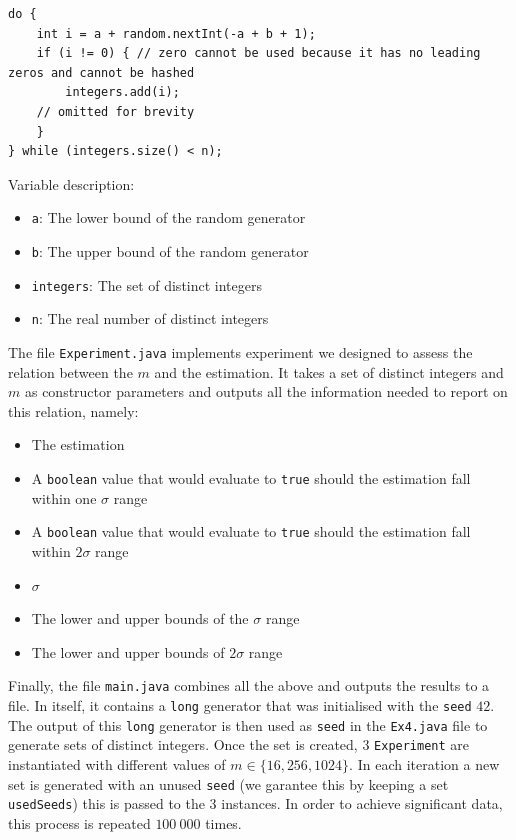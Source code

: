 \documentclass{tufte-handout}
\begin{document}
\begin{lstlisting}
do {
	int i = a + random.nextInt(-a + b + 1);
	if (i != 0) { // zero cannot be used because it has no leading zeros and cannot be hashed
		integers.add(i);
    // omitted for brevity
	}			
} while (integers.size() < n);
\end{lstlisting}
\noindent
Variable description:
\begin{itemize}
    \item {\tt a}: The lower bound of the random generator
    \item {\tt b}: The upper bound of the random generator
    \item {\tt integers}: The set of distinct integers
    \item {\tt n}: The real number of distinct integers
\end{itemize}
\noindent
The file {\tt Experiment.java} implements experiment we designed to assess the relation between the $m$ and the estimation. It takes a set of distinct integers and $m$ as constructor parameters and outputs all the information needed to report on this relation, namely:
\begin{itemize}
    \item The estimation
    \item A {\tt boolean} value that would evaluate to {\tt true} should the estimation fall within one $\sigma$ range  
    \item A {\tt boolean} value that would evaluate to {\tt true} should the estimation fall within $2\sigma$ range 
    \item $\sigma$
    \item The lower and upper bounds of the $\sigma$ range
    \item The lower and upper bounds of $2\sigma$ range
\end{itemize}
\noindent
Finally, the file {\tt main.java} combines all the above and outputs the results to a file. In itself, it contains a {\tt long} generator that was initialised with the {\tt seed} $42$. The output of this {\tt long} generator is then used as {\tt seed} in the {\tt Ex4.java} file to generate sets of distinct integers. Once the set is created, $3$ {\tt Experiment} are instantiated with different values of $m\in\{16, 256, 1024\}$. In each iteration a new set is generated with an unused {\tt seed} (we garantee this by keeping a set {\tt usedSeeds}) this is passed to the $3$ instances. In order to achieve significant data, this process is repeated $100\ 000$ times.
\end{document}
